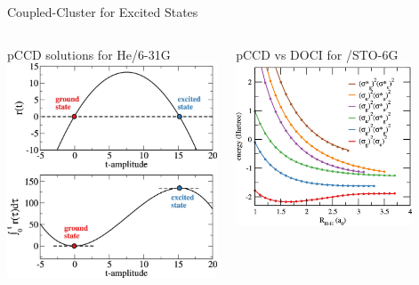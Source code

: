 \documentclass[aspectratio=169,9pt]{beamer}
\begin{document}
\begin{frame}{Coupled-Cluster for Excited States}
\begin{columns}
                \begin{column}{0.35\textwidth}
                        \begin{block}{pCCD solutions for He/6-31G}
                                \centering
                                \includegraphics[width=\textwidth]{fig/scan_t}
                        \end{block}
                \end{column}
                \begin{column}{0.40\textwidth}
                        \centering
                        \begin{block}{pCCD vs DOCI for /STO-6G}
                                \centering
                                \includegraphics[width=0.8\textwidth]{fig/pccd.jpeg}
                        \end{block}
                \end{column}
        \end{columns}

\end{frame}
\end{document}
